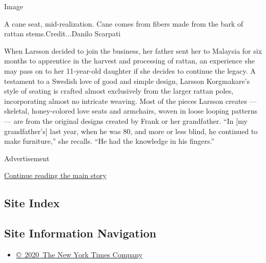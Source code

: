 Image

A cane seat, mid-realization. Cane comes from fibers made from the bark
of rattan stems.Credit...Danilo Scarpati

When Larsson decided to join the business, her father sent her to
Malaysia for six months to apprentice in the harvest and processing of
rattan, an experience she may pass on to her 11-year-old daughter if she
decides to continue the legacy. A testament to a Swedish love of good
and simple design, Larsson Korgmakare's style of seating is crafted
almost exclusively from the larger rattan poles, incorporating almost no
intricate weaving. Most of the pieces Larsson creates --- skeletal,
honey-colored love seats and armchairs, woven in loose looping patterns
--- are from the original designs created by Frank or her grandfather.
``In {[}my grandfather's{]} last year, when he was 80, and more or less
blind, he continued to make furniture,'' she recalls. ``He had the
knowledge in his fingers.''

Advertisement

\protect\hyperlink{after-bottom}{Continue reading the main story}

\hypertarget{site-index}{%
\subsection{Site Index}\label{site-index}}

\hypertarget{site-information-navigation}{%
\subsection{Site Information
Navigation}\label{site-information-navigation}}

\begin{itemize}
\tightlist
\item
  \href{https://help.nytimes3xbfgragh.onion/hc/en-us/articles/115014792127-Copyright-notice}{©~2020~The
  New York Times Company}
\end{itemize}

